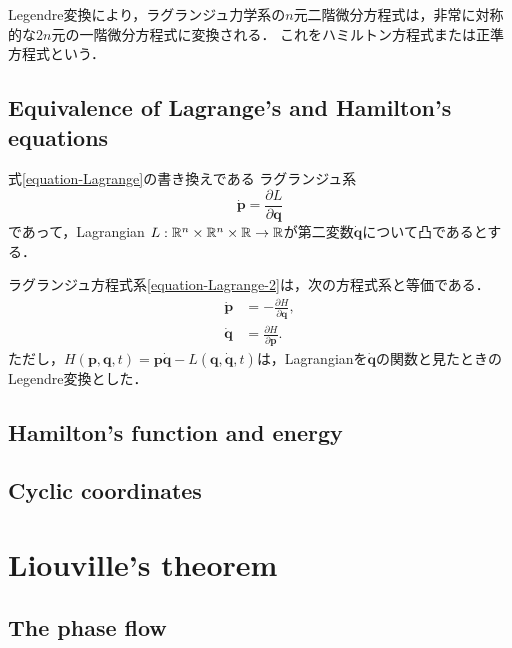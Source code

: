 \documentclass[uplatex,dvipdfmx]{jsreport}
\begin{document}
\begin{screen}
    Legendre変換により，ラグランジュ力学系の$n$元二階微分方程式は，非常に対称的な$2n$元の一階微分方程式に変換される．
    これをハミルトン方程式または正準方程式という．
\end{screen}

\subsection{Equivalence of Lagrange's and Hamilton's equations}

式\ref{equation-Lagrange}の書き換えである
ラグランジュ系
\begin{equation}\label{equation-Lagrange-2}
    \dot{\mathbf{p}}=\frac{\partial L}{\partial\mathbf{q}}
\end{equation}
であって，Lagrangian $L:\mathbb{R}^n\times\mathbb{R}^n\times\mathbb{R}\to\mathbb{R}$が第二変数$\dot{\mathbf{q}}$について凸であるとする．

\begin{theorem}
    ラグランジュ方程式系\ref{equation-Lagrange-2}は，次の方程式系と等価である．
    \begin{align*}
        \dot{\mathbf{p}} &= -\frac{\partial H}{\partial\mathbf{q}},\\
        \dot{\mathbf{q}} &= \frac{\partial H}{\partial\mathbf{p}}.
    \end{align*}
    ただし，$H(\mathbf{p},\mathbf{q},t)=\mathbf{p\dot{q}}-L(\mathbf{q},\dot{\mathbf{q}},t)$は，Lagrangianを$\dot{\mathbf{q}}$の関数と見たときのLegendre変換とした．
\end{theorem}

\subsection{Hamilton's function and energy}

\subsection{Cyclic coordinates}

\section{Liouville's theorem}

\subsection{The phase flow}
\end{document}
